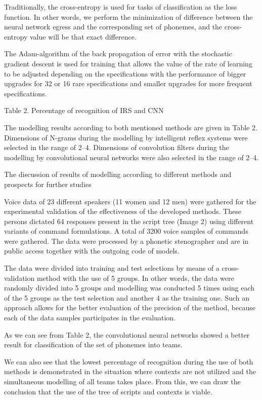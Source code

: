 Traditionally, the cross-entropy is used for tasks of classification as the loss function. In other words, we perform the minimization of difference between the neural network egress and the corresponding set of phonemes, and the cross-entropy value will be that exact difference. 

The Adam-algorithm of the back propagation of error with the stochastic gradient descent is used for training that allows the value of the rate of learning to be adjusted depending on the specifications with the performance of bigger upgrades for 32 or 16 rare specifications and smaller upgrades for more frequent specifications. 

Table 2. Percentage of recognition of IRS and CNN

The modelling results according to both mentioned methods are given in Table 2. Dimensions of N-grams during the modelling by intelligent reflex systems were selected in the range of 2--4. Dimensions of convolution filters during the modelling by convolutional neural networks were also selected in the range of 2--4.

The discussion of results of modelling according to different methods and prospects for further studies

Voice data of 23 different speakers (11 women and 12 men) were gathered for the experimental validation of the effectiveness of the developed methods. These persons dictated 64 responses present in the script tree (Image 2) using different variants of command formulations. A total of 3200 voice samples of commands were gathered. The data were processed by a phonetic stenographer and are in public access together with the outgoing code of models. 

The data were divided into training and test selections by means of a cross-validation method with the use of 5 groups. In other words, the data were randomly divided into 5 groups and modelling was conducted 5 times using each of the 5 groups as the test selection and another 4 as the training one. Such an approach allows for the better evaluation of the precision of the method, because each of the data samples participates in the evaluation.

As we can see from Table 2, the convolutional neural networks showed a better result for classification of the set of phonemes into teams. 

We can also see that the lowest percentage of recognition during the use of both methods is demonstrated in the situation where contexts are not utilized and the simultaneous modelling of all teams takes place. From this, we can draw the conclusion that the use of the tree of scripts and contexts is viable. 

